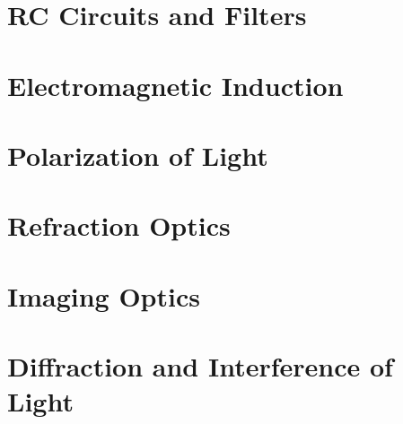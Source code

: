\documentclass[12pt,letterpaper]{book}
\begin{document}
\chapter{RC Circuits and Filters}


\chapter{Electromagnetic Induction}


\chapter{Polarization of Light}
\label{ch:pol} %


\chapter{Refraction Optics}
\label{ch:optics}


\chapter{Imaging Optics}
\label{ch:imaging}


\chapter{Diffraction and Interference of Light}





    
\end{document}
